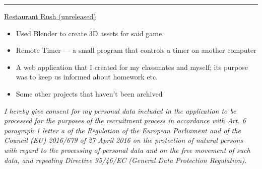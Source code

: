 \documentclass[10pt,a4paper,ragged2e,withhyper]{altacv}
\begin{document}
\begin{paracol}{2}




\bigskip

{\color{headingrule}\rule{\linewidth}{2pt}\par}

\bigskip

\small\href{https://github.com/Qarian/Restaurant-rush}{Restaurant Rush (unreleased)}
\smallskip

\begin{itemize}
    \item Used Blender to create 3D assets for said game.
\end{itemize}

\divider

\begin{itemize}
    \item Remote Timer — a small program that controls a timer on another computer
    \item A web application that I created for my classmates and myself; its purpose was to keep us informed about homework etc.
    \item Some other projects that haven’t been archived
\end{itemize}

\divider

\end{paracol}

\vspace{8pt}

\small\textit{I hereby give consent for my personal data included in the application to be processed for the purposes of the recruitment process in accordance with Art. 6 paragraph 1 letter a of the Regulation of the European Parliament and of the Council (EU) 2016/679 of 27 April 2016 on the protection of natural persons with regard to the processing of personal data and on the free movement of such data, and repealing Directive 95/46/EC (General Data Protection Regulation).}
\end{document}
